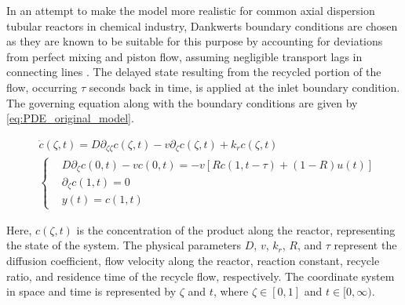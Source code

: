 In an attempt to make the model more realistic for common axial dispersion tubular reactors in chemical industry, Dankwerts boundary conditions are chosen as they are known to be suitable for this purpose by accounting for deviations from perfect mixing and piston flow, assuming negligible transport lags in connecting lines \cite{danckwerts1993continuous}. The delayed state resulting from the recycled portion of the flow, occurring $\tau$ seconds back in time, is applied at the inlet boundary condition. The governing equation along with the boundary conditions are given by \eqref{eq:PDE_original_model}.

\begin{equation} \label{eq:PDE_original_model}
    \begin{aligned}
        &\dot{c}(\zeta, t) = D \partial_{\zeta \zeta} c(\zeta, t) - v \partial_\zeta c(\zeta, t) + k_r c(\zeta, t) \\
        &\begin{cases}
            &D \partial_\zeta c(0, t) - v c(0, t) = -v \left[ R c(1, t-\tau) + (1-R) u(t) \right] \\
            &\partial_\zeta c(1, t) = 0 \\
            &y(t) = c(1, t)
        \end{cases}
    \end{aligned}
\end{equation}

Here, $c(\zeta, t)$ is the concentration of the product along the reactor, representing the state of the system. The physical parameters $D$, $v$, $k_r$, $R$, and $\tau$ represent the diffusion coefficient, flow velocity along the reactor, reaction constant, recycle ratio, and residence time of the recycle flow, respectively. The coordinate system in space and time is represented by $\zeta$ and $t$, where $\zeta \in [0, 1]$ and $t \in [0, \infty)$.


